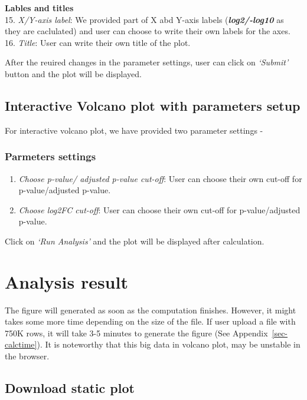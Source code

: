 \documentclass[
  a4paper,
  DIV=11,
  numbers=noendperiod,
  oneside,
  open=any]{scrreport}
\providecommand{\tightlist}{%
  \setlength{\itemsep}{0pt}\setlength{\parskip}{0pt}}\usepackage{longtable,booktabs,array}
\begin{document}
\textbf{Lables and titles}\\
15. \emph{X/Y-axis label}: We provided part of X abd Y-axis labels
(\textbf{\emph{log2/-log10}} as they are caclulated) and user can choose
to write their own labels for the axes. 16. \emph{Title}: User can write
their own title of the plot.

After the reuired changes in the parameter settings, user can click on
\emph{`Submit'} button and the plot will be displayed.

\subsection{Interactive Volcano plot with parameters
setup}\label{interactive-volcano-plot-with-parameters-setup}

For interactive volcano plot, we have provided two parameter settings -

\subsubsection{Parmeters settings}\label{parmeters-settings}

\begin{enumerate}
\def\labelenumi{\arabic{enumi}.}
\tightlist
\item
  \emph{Choose p-value/ adjusted p-value cut-off}: User can choose their
  own cut-off for p-value/adjusted p-value.
\item
  \emph{Choose log2FC cut-off}: User can choose their own cut-off for
  p-value/adjusted p-value.
\end{enumerate}

Click on \emph{`Run Analysis'} and the plot will be displayed after
calculation.

\section{Analysis result}\label{analysis-result-2}

The figure will generated as soon as the computation finishes. However,
it might takes some more time depending on the size of the file. If user
upload a file with 750K rows, it will take 3-5 minutes to generate the
figure (See Appendix~\ref{sec-calctime}). It is noteworthy that this big
data in volcano plot, may be unstable in the browser.

\subsection{Download static plot}\label{download-static-plot}
\end{document}

